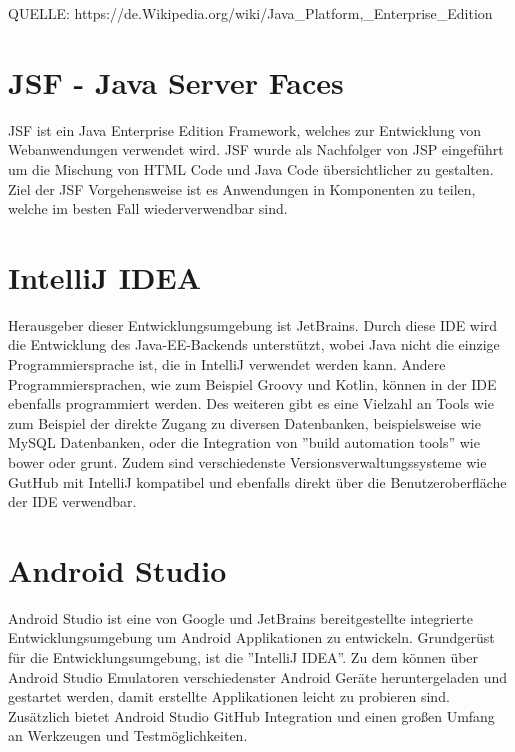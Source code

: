 QUELLE: https://de.Wikipedia.org/wiki/Java_Platform,_Enterprise_Edition

\section{JSF - Java Server Faces}\label{sec:javaee}
JSF ist ein Java Enterprise Edition Framework, welches zur Entwicklung von Webanwendungen verwendet wird. JSF wurde als Nachfolger von JSP eingeführt um die Mischung von HTML Code und Java Code übersichtlicher zu gestalten. Ziel der JSF Vorgehensweise ist es Anwendungen in Komponenten zu teilen, welche im besten Fall wiederverwendbar sind.

\section{IntelliJ IDEA}
Herausgeber dieser Entwicklungsumgebung ist JetBrains. Durch diese IDE wird die Entwicklung des Java-EE-Backends unterstützt, wobei Java nicht die einzige Programmiersprache ist, die in IntelliJ verwendet werden kann. Andere Programmiersprachen, wie zum Beispiel Groovy und Kotlin, können in der IDE ebenfalls programmiert werden. Des weiteren gibt es eine Vielzahl an Tools wie zum Beispiel der direkte Zugang zu diversen Datenbanken, beispielsweise wie MySQL Datenbanken, oder die Integration von ''build automation tools'' wie bower oder grunt. Zudem sind verschiedenste Versionsverwaltungssysteme wie GutHub mit IntelliJ kompatibel und ebenfalls direkt über die Benutzeroberfläche der IDE verwendbar.

\section{Android Studio}
Android Studio ist eine von Google und JetBrains bereitgestellte integrierte Entwicklungsumgebung um Android Applikationen zu entwickeln. Grundgerüst für die Entwicklungsumgebung, ist die ''IntelliJ IDEA''. Zu dem können über Android Studio Emulatoren verschiedenster Android Geräte heruntergeladen und gestartet werden, damit erstellte Applikationen leicht zu probieren sind. Zusätzlich bietet Android Studio GitHub Integration und einen großen Umfang an Werkzeugen und Testmöglichkeiten.
  